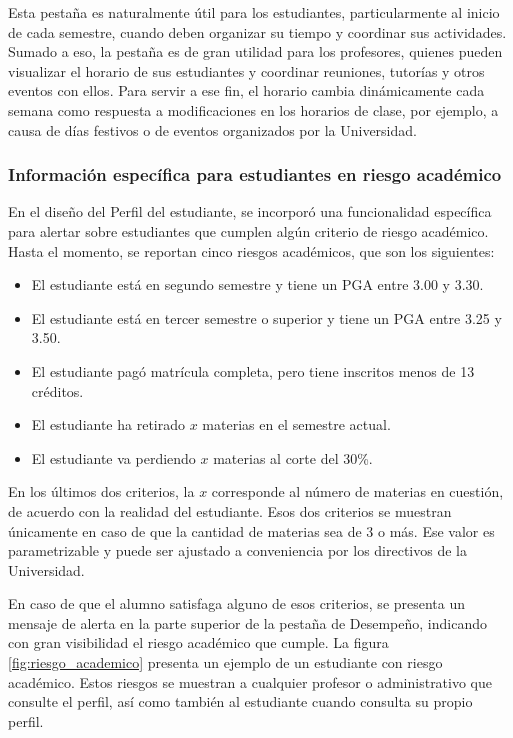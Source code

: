Esta pestaña es naturalmente útil para los estudiantes, particularmente al inicio de cada semestre, cuando deben organizar su tiempo y coordinar sus actividades. Sumado a eso, la pestaña es de gran utilidad para los profesores, quienes pueden visualizar el horario de sus estudiantes y coordinar reuniones, tutorías y otros eventos con ellos. Para servir a ese fin, el horario cambia dinámicamente cada semana como respuesta a modificaciones en los horarios de clase, por ejemplo, a causa de días festivos o de eventos organizados por la Universidad.

\subsubsection{Información específica para estudiantes en riesgo académico}

En el diseño del Perfil del estudiante, se incorporó una funcionalidad específica para alertar sobre estudiantes que cumplen algún criterio de riesgo académico. Hasta el momento, se reportan cinco riesgos académicos, que son los siguientes:
\begin{itemize}
  \item El estudiante está en segundo semestre y tiene un PGA entre 3.00 y 3.30.
  \item El estudiante está en tercer semestre o superior y tiene un PGA entre 3.25 y 3.50.
  \item El estudiante pagó matrícula completa, pero tiene inscritos menos de 13 créditos.
  \item El estudiante ha retirado $x$ materias en el semestre actual.
  \item El estudiante va perdiendo $x$ materias al corte del 30\%.
\end{itemize}

En los últimos dos criterios, la $x$ corresponde al número de materias en cuestión, de acuerdo con la realidad del estudiante. Esos dos criterios se muestran únicamente en caso de que la cantidad de materias sea de 3 o más. Ese valor es parametrizable y puede ser ajustado a conveniencia por los directivos de la Universidad.

En caso de que el alumno satisfaga alguno de esos criterios, se presenta un mensaje de alerta en la parte superior de la pestaña de Desempeño, indicando con gran visibilidad el riesgo académico que cumple. La figura \ref{fig:riesgo_academico} presenta un ejemplo de un estudiante con riesgo académico. Estos riesgos se muestran a cualquier profesor o administrativo que consulte el perfil, así como también al estudiante cuando consulta su propio perfil.

